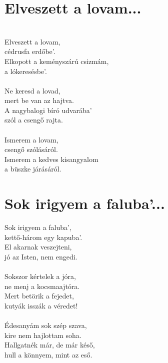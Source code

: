 	\section{Elveszett a lovam...}
	\\
		Elveszett a lovam,\\
		cédrusfa erdőbe’.\\
		Elkopott a keményszárú csizmám,\\
		a lókeresésbe’.\\\\
		Ne keresd a lovad,\\
		mert be van az hajtva.\\
		A nagybalogi bíró udvarába’\\
		szól a csengő rajta.\\\\
		Ismerem a lovam,\\
		csengő szólásáról.\\
		Ismerem a kedves kisangyalom\\
		a büszke járásáról.\\
	\section{Sok irigyem a faluba'...}
		Sok irigyem a faluba’,\\
		kettő-három egy kapuba’.\\
		El akarnak veszejteni,\\
		jó az Isten, nem engedi.\\\\
		Sokszor kértelek a jóra,\\
		ne menj a kocsmaajtóra.\\
		Mert betörik a fejedet,\\
		kutyák isszák a véredet!\\\\
		Édesanyám sok szép szava,\\
		kire nem hajlottam soha.\\
		Hallgatnék már, de már késő,\\
		hull a könnyem, mint az eső.\\